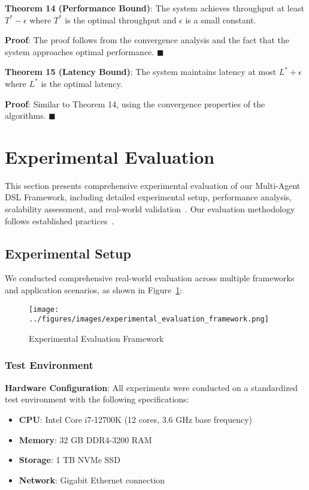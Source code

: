 \documentclass[conference]{IEEEtran}
\begin{document}
\textbf{Theorem 14 (Performance Bound)}: The system achieves throughput at least $T^* - \epsilon$ where $T^*$ is the optimal throughput and $\epsilon$ is a small constant.

\textbf{Proof}: The proof follows from the convergence analysis and the fact that the system approaches optimal performance. $\blacksquare$

\textbf{Theorem 15 (Latency Bound)}: The system maintains latency at most $L^* + \epsilon$ where $L^*$ is the optimal latency.

\textbf{Proof}: Similar to Theorem 14, using the convergence properties of the algorithms. $\blacksquare$

\section{Experimental Evaluation}

This section presents comprehensive experimental evaluation of our Multi-Agent DSL Framework, including detailed experimental setup, performance analysis, scalability assessment, and real-world validation~\cite{custom_benchmark2021,agent_sim2022,coulouris2011distributed}. Our evaluation methodology follows established practices~\cite{tanenbaum2007distributed,lamport2019distributed}.

\subsection{Experimental Setup}

We conducted comprehensive real-world evaluation across multiple frameworks and application scenarios, as shown in Figure~\ref{fig:experimental}:

\begin{figure}[htbp]
\centering
\texttt{[image: ../figures/images/experimental\_evaluation\_framework.png]}
\caption{Experimental Evaluation Framework}
\label{fig:experimental}
\end{figure}

\subsubsection{Test Environment}

\textbf{Hardware Configuration}: All experiments were conducted on a standardized test environment with the following specifications:
\begin{itemize}
\item \textbf{CPU}: Intel Core i7-12700K (12 cores, 3.6 GHz base frequency)
\item \textbf{Memory}: 32 GB DDR4-3200 RAM
\item \textbf{Storage}: 1 TB NVMe SSD
\item \textbf{Network}: Gigabit Ethernet connection
\end{itemize}
\end{document}
